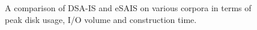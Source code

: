 \documentclass[10pt,journal,compsoc]{IEEEtran}
\begin{document}
\begin{figure}[t]
	\centering
	\hfil
	\hfil
	\caption{A comparison of DSA-IS and eSAIS on various corpora in terms of peak disk usage, I/O volume and construction time.}
	\label{fig:verification_performance}
\end{figure}
\end{document}
